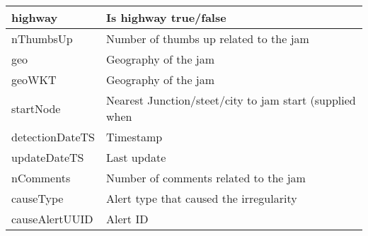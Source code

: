\begin{table*}[h!]
{\begin{tabular}{l l}
highway         & Is   highway true/false                                             \\ \hline
nThumbsUp       & Number   of thumbs up related to the jam                            \\ \hline
geo             & Geography   of the jam                                              \\ \hline
geoWKT          & Geography   of the jam                                              \\ \hline
startNode       & Nearest   Junction/steet/city to jam start (supplied when           \\ \hline
detectionDateTS & Timestamp                                                           \\ \hline
updateDateTS    & Last   update                                                       \\ \hline
nComments       & Number   of comments related to the jam                             \\ \hline
causeType       & Alert   type that caused the irregularity                           \\ \hline
causeAlertUUID  & Alert   ID                                                         \\ \bottomrule
\end{tabular}
}
\label{table:waze_irregularities}

\end{table*}

